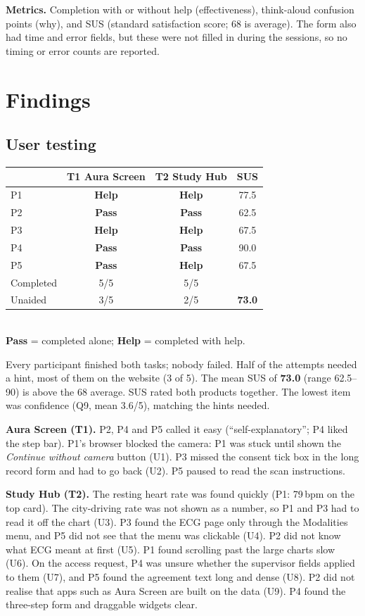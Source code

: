 \documentclass[10pt,a4paper,twocolumn]{article}
\newcommand{\pass}{\textcolor{green!45!black}{\textbf{Pass}}}
\newcommand{\helped}{\textcolor{orange!80!black}{\textbf{Help}}}
\begin{document}
\textbf{Metrics.} Completion with or without help (effectiveness), think-aloud
confusion points (why), and SUS (standard satisfaction score; 68 is average). The
form also had time and error fields, but these were not filled in during the
sessions, so no timing or error counts are reported.

\section{Findings}
\subsection{User testing}\label{sec:ut}
\begin{center}\small
\begin{tabular}{@{}lccc@{}}
\toprule
 & T1 Aura Screen & T2 Study Hub & SUS \\
\midrule
P1 & \helped & \helped & 77.5 \\
P2 & \pass & \pass & 62.5 \\
P3 & \helped & \helped & 67.5 \\
P4 & \pass & \pass & 90.0 \\
P5 & \pass & \helped & 67.5 \\
\midrule
Completed & 5/5 & 5/5 & \\
Unaided & 3/5 & 2/5 & \textbf{73.0} \\
\bottomrule
\end{tabular}\\[2pt]
{\footnotesize \pass{} = completed alone; \helped{} = completed with help.}
\end{center}
Every participant finished both tasks; nobody failed. Half of the attempts needed a
hint, most of them on the website (3 of 5). The mean SUS of \textbf{73.0} (range
62.5--90) is above the 68 average. SUS rated both products together. The lowest
item was confidence (Q9, mean 3.6/5), matching the hints needed.

\textbf{Aura Screen (T1).} P2, P4 and P5 called it easy (``self-explanatory'';
P4 liked the step bar). P1's browser blocked the camera: P1 was stuck until shown
the \emph{Continue without camera} button (U1). P3 missed the consent tick box in
the long record form and had to go back (U2). P5 paused to read the scan
instructions.

\textbf{Study Hub (T2).} The resting heart rate was found quickly (P1: 79\,bpm on
the top card). The city-driving rate was not shown as a number, so P1 and P3 had to
read it off the chart (U3). P3 found the ECG page only through the Modalities menu,
and P5 did not see that the menu was clickable (U4). P2 did not know what ECG meant
at first (U5). P1 found scrolling past the large charts slow (U6). On the access
request, P4 was unsure whether the supervisor fields applied to them (U7), and P5
found the agreement text long and dense (U8). P2 did not realise that apps such as
Aura Screen are built on the data (U9). P4 found the three-step form and
draggable widgets clear.
\end{document}
